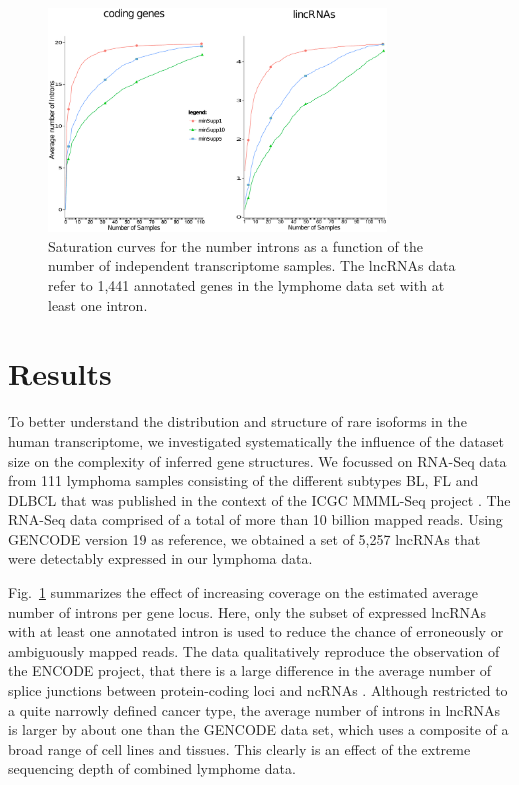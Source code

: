\documentclass[ncrna,article,submit,moreauthors,pdftex,10pt,a4paper]{mdpi}
\begin{document}
\begin{figure}[t]
\begin{center}
  \includegraphics[width=0.8\textwidth]{saturation}
\end{center}
\caption{Saturation curves for the number introns as a function of the 
  number of independent transcriptome samples. The lncRNAs data refer to 1,441 annotated  genes in the lymphome data set with at least one intron. 
  }
  \label{fig:saturation} 
\end{figure}

\section{Results}

To better understand the distribution and structure of rare isoforms in
the human transcriptome, we investigated systematically the influence of the
dataset size on the complexity of inferred gene structures. We focussed on
RNA-Seq data from 111 lymphoma samples consisting of the different subtypes
BL, FL and DLBCL that was published in the context of the ICGC MMML-Seq
project \cite{Richter:12a}. The RNA-Seq data comprised of a total of more
than 10 billion mapped reads. Using GENCODE version 19 as reference, we
obtained a set of 5,257 lncRNAs that were detectably expressed in our
lymphoma data.

Fig.~\ref{fig:saturation} summarizes the effect of increasing coverage on
the estimated average number of introns per gene locus. Here, only the
subset of expressed lncRNAs with at least one annotated intron is used to
reduce the chance of erroneously or ambiguously mapped reads. The data
qualitatively reproduce the observation of the ENCODE project, that there
is a large difference in the average number of splice junctions between
protein-coding loci and ncRNAs \cite{Derrien:12}. Although restricted to a
quite narrowly defined cancer type, the average number of introns in
lncRNAs is larger by about one than the GENCODE data set, which uses a
composite of a broad range of cell lines and tissues. This clearly is an
effect of the extreme sequencing depth of combined lymphome data. 
\end{document}
